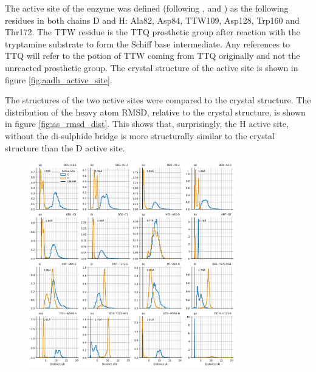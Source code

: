 The active site of the enzyme was defined (following \cite{ranaghanInitioQMMM2017}, \cite{masgrauAtomicDescriptionEnzyme2006} and \cite{masgrauTunnelingClassicalPaths2007}) as the following residues in both chains D and H: Ala82, Asp84, TTW109, Asp128, Trp160 and Thr172. The TTW residue is the TTQ prosthetic group after reaction with the tryptamine substrate to form the Schiff base intermediate. Any references to TTQ will refer to the potion of TTW coming from TTQ originally and not the unreacted prosthetic group. The crystal structure of the active site is shown in figure \ref{fig:aadh_active_site}. 

The structures of the two active sites were compared to the crystal structure. The distribution of the heavy atom RMSD, relative to the crystal structure, is shown in figure \ref{fig:as_rmsd_dist}. This shows that, surprisingly, the H active site, without the di-sulphide bridge is more structurally similar to the crystal structure than the D active site. 

\begin{figure}
    \centering
    \includegraphics[width=0.8\textwidth]{chapters/aadh/figures/bond_distances_dist.png}
    \label{fig:bond_dist}
\end{figure}

